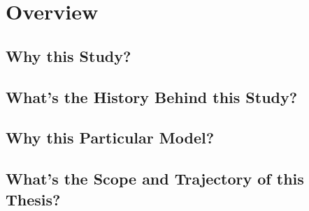 \chapter{Overview}
\label{chap:over}

\section{Why this Study?}

\section{What's the History Behind this Study?}

\section{Why this Particular Model?}

\section{What's the Scope and Trajectory of this Thesis?}
